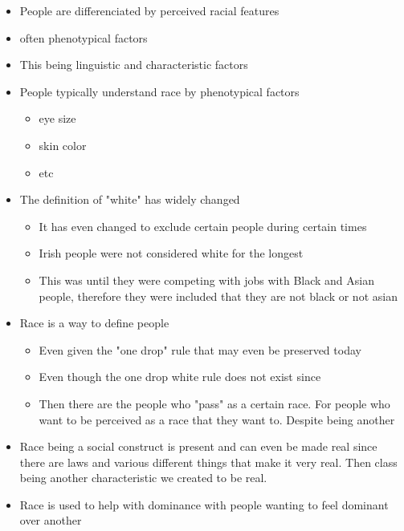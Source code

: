 \documentclass{article}
\begin{document}
\begin{itemize}
  \item People are differenciated by perceived racial features 
  \item often phenotypical factors
  \item This being linguistic and characteristic factors
  \item People typically understand race by phenotypical factors
    \begin{itemize}
      \item eye size
      \item skin color
      \item etc
    \end{itemize}
  \item The definition of "white" has widely changed
    \begin{itemize}
      \item It has even changed to exclude certain people during certain times
      \item Irish people were not considered white for the longest
      \item This was until they were competing with jobs with Black and Asian people,
        therefore they were included that they are not black or not asian
    \end{itemize}
  \item Race is a way to define people
    \begin{itemize}
      \item Even given the "one drop" rule that may even be preserved today 
      \item Even though the one drop white rule does not exist since 
      \item Then there are the people who "pass" as a certain race.
        For people who want to be perceived as a race that they want to. Despite being another
    \end{itemize}
      \item Race being a social construct is present and can even be made real since there are
        laws and various different things that make it very real. 
        Then class being another characteristic we created to be real.
      \item Race is used to help with dominance with people wanting to feel dominant over another
\end{itemize}
\end{document}
